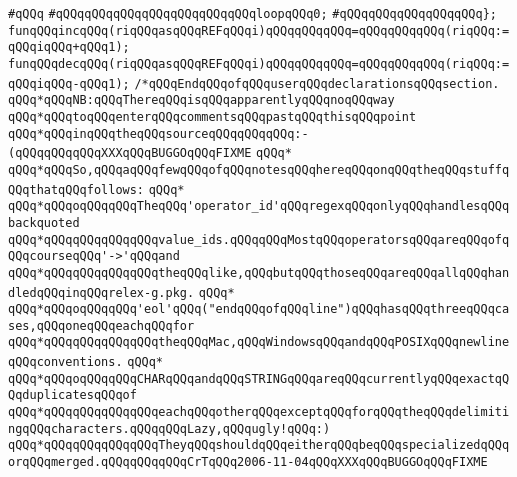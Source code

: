 \verb|#qQQq|\newline
\verb|#qQQqqQQqqQQqqQQqqQQqqQQqqQQqloopqQQq0;|\newline
\verb|#qQQqqQQqqQQqqQQqqQQq};|\newline
\newline
\verb|funqQQqincqQQq(riqQQqasqQQqREFqQQqi)qQQqqQQqqQQq=qQQqqQQqqQQq(riqQQq:=qQQqiqQQq+qQQq1);|\newline
\verb|funqQQqdecqQQq(riqQQqasqQQqREFqQQqi)qQQqqQQqqQQq=qQQqqQQqqQQq(riqQQq:=qQQqiqQQq-qQQq1);|\newline
\newline
\verb|/*qQQqEndqQQqofqQQquserqQQqdeclarationsqQQqsection.|\newline
\verb|qQQq*qQQqNB:qQQqThereqQQqisqQQqapparentlyqQQqnoqQQqway|\newline
\verb|qQQq*qQQqtoqQQqenterqQQqcommentsqQQqpastqQQqthisqQQqpoint|\newline
\verb|qQQq*qQQqinqQQqtheqQQqsourceqQQqqQQqqQQq:-(qQQqqQQqqQQqXXXqQQqBUGGOqQQqFIXME|\newline
\verb|qQQq*|\newline
\verb|qQQq*qQQqSo,qQQqaqQQqfewqQQqofqQQqnotesqQQqhereqQQqonqQQqtheqQQqstuffqQQqthatqQQqfollows:|\newline
\verb|qQQq*|\newline
\verb|qQQq*qQQqoqQQqqQQqTheqQQq'operator_id'qQQqregexqQQqonlyqQQqhandlesqQQqbackquoted|\newline
\verb|qQQq*qQQqqQQqqQQqqQQqvalue_ids.qQQqqQQqMostqQQqoperatorsqQQqareqQQqofqQQqcourseqQQq'->'qQQqand|\newline
\verb|qQQq*qQQqqQQqqQQqqQQqtheqQQqlike,qQQqbutqQQqthoseqQQqareqQQqallqQQqhandledqQQqinqQQqrelex-g.pkg.|\newline
\verb|qQQq*|\newline
\verb|qQQq*qQQqoqQQqqQQq'eol'qQQq("endqQQqofqQQqline")qQQqhasqQQqthreeqQQqcases,qQQqoneqQQqeachqQQqfor|\newline
\verb|qQQq*qQQqqQQqqQQqqQQqtheqQQqMac,qQQqWindowsqQQqandqQQqPOSIXqQQqnewlineqQQqconventions.|\newline
\verb|qQQq*|\newline
\verb|qQQq*qQQqoqQQqqQQqCHARqQQqandqQQqSTRINGqQQqareqQQqcurrentlyqQQqexactqQQqduplicatesqQQqof|\newline
\verb|qQQq*qQQqqQQqqQQqqQQqeachqQQqotherqQQqexceptqQQqforqQQqtheqQQqdelimitingqQQqcharacters.qQQqqQQqLazy,qQQqugly!qQQq:)|\newline
\verb|qQQq*qQQqqQQqqQQqqQQqTheyqQQqshouldqQQqeitherqQQqbeqQQqspecializedqQQqorqQQqmerged.qQQqqQQqqQQqCrTqQQq2006-11-04qQQqXXXqQQqBUGGOqQQqFIXME|\newline
